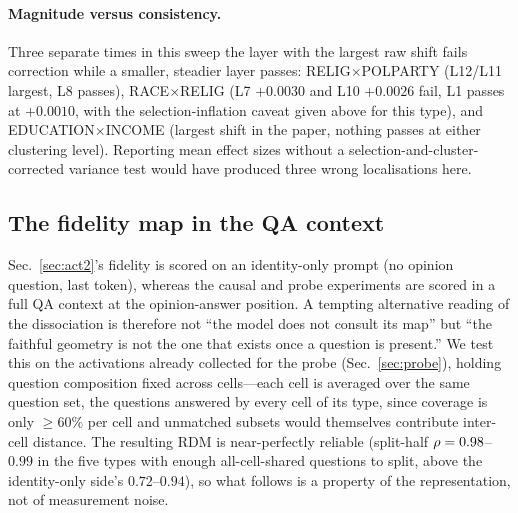\paragraph{Magnitude versus consistency.}
\label{app:magnitude-consistency}
Three separate times
in this sweep the layer with the largest raw shift fails correction while
a smaller, steadier layer passes: RELIG$\times$POLPARTY (L12/L11 largest,
L8 passes), RACE$\times$RELIG (L7 $+0.0030$ and L10 $+0.0026$ fail, L1
passes at $+0.0010$, with the selection-inflation caveat given above for
this type), and EDUCATION$\times$INCOME (largest shift in the
paper, nothing passes at either clustering level). Reporting mean effect
sizes without a selection-and-cluster-corrected variance test would have
produced three wrong localisations here.

\subsection{The fidelity map in the QA context}
\label{app:qa-context-map}
Sec.~\ref{sec:act2}'s fidelity
is scored on an identity-only prompt (no opinion question, last token),
whereas the causal and probe experiments are scored in a full QA
context at the opinion-answer position. A tempting alternative reading
of the dissociation is therefore not ``the model does not consult its
map'' but ``the faithful geometry is not the one that exists once a
question is present.'' We test this on the activations already
collected for the probe (Sec.~\ref{sec:probe}), holding question
composition fixed across cells---each cell is averaged over the same
question set, the questions answered by every cell of its type, since
coverage is only ${\ge}60\%$ per cell and unmatched subsets would
themselves contribute inter-cell distance. The resulting RDM is
near-perfectly reliable (split-half $\rho=0.98$--$0.99$ in the five
types with enough all-cell-shared questions to split, above the
identity-only side's $0.72$--$0.94$), so what follows is a property of
the representation, not of measurement noise.

